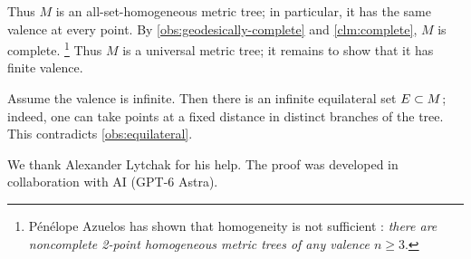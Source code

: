 \documentclass[leqno,a4paper,10pt]{article}
\begin{document}
Thus $M$ is an all-set-homogeneous metric tree;
in particular, it has the same valence at every point.
By \ref{obs:geodesically-complete} and \ref{clm:complete}, $M$ is complete.%
\footnote{Pénélope Azuelos has shown that homogeneity is not sufficient \cite{azuelos2025}:
\emph{there are noncomplete 2-point homogeneous metric trees  of any valence $n\ge 3$}.}
Thus $M$ is a universal metric tree;
it remains to show that it has finite valence.

Assume the valence is infinite.
Then there is an infinite equilateral set $E\z\subset M$;
indeed, one can take points at a fixed distance in distinct branches of the tree.
This contradicts \ref{obs:equilateral}.
\qeds


We thank Alexander Lytchak for his help.
The proof was developed in collaboration with AI (GPT-6 Astra).

{\sloppy
\printbibliography[heading=bibintoc]
\fussy
}
\end{document}
